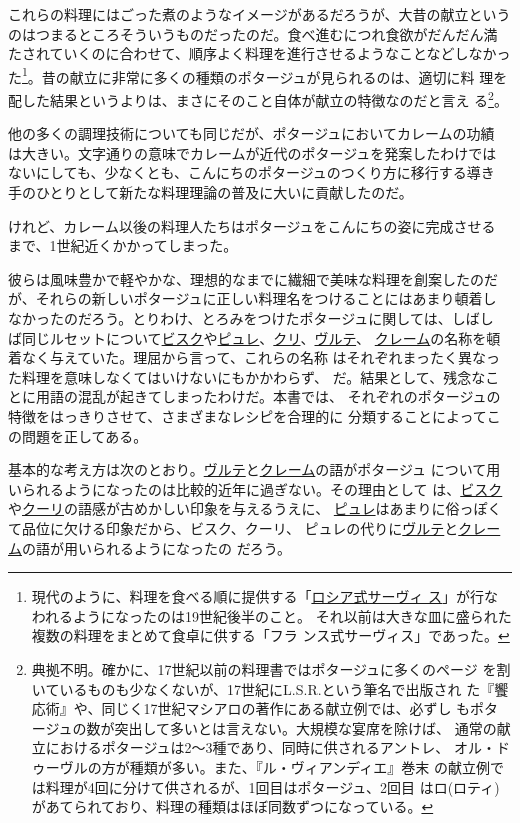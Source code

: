 これらの料理にはごった煮のようなイメージがあるだろうが、大昔の献立という
のはつまるところそういうものだったのだ。食べ進むにつれ食欲がだんだん満
たされていくのに合わせて、順序よく料理を進行させるようなことなどしなかっ
た\footnote{現代のように、料理を食べる順に提供する「\protect\hyperlink{service-russe}{ロシア式サーヴィ
  ス}」が行なわれるようになったのは19世紀後半のこと。
  それ以前は大きな皿に盛られた複数の料理をまとめて食卓に供する「フラ
  ンス式サーヴィス」であった。}。昔の献立に非常に多くの種類のポタージュが見られるのは、適切に料
理を配した結果というよりは、まさにそのこと自体が献立の特徴なのだと言え
る\footnote{典拠不明。確かに、17世紀以前の料理書ではポタージュに多くのページ
  を割いているものも少なくないが、17世紀にL.S.R.という筆名で出版され
  た『饗応術』や、同じく17世紀マシアロの著作にある献立例では、必ずし
  もポタージュの数が突出して多いとは言えない。大規模な宴席を除けば、
  通常の献立におけるポタージュは2〜3種であり、同時に供されるアントレ、
  オル・ドゥーヴルの方が種類が多い。また、『ル・ヴィアンディエ』巻末
  の献立例では料理が4回に分けて供されるが、1回目はポタージュ、2回目
  はロ(ロティ)があてられており、料理の種類はほぼ同数ずつになっている。}。

他の多くの調理技術についても同じだが、ポタージュにおいてカレームの功績
は大きい。文字通りの意味でカレームが近代のポタージュを発案したわけでは
ないにしても、少なくとも、こんにちのポタージュのつくり方に移行する導き
手のひとりとして新たな料理理論の普及に大いに貢献したのだ。

けれど、カレーム以後の料理人たちはポタージュをこんにちの姿に完成させる
まで、1世紀近くかかってしまった。

彼らは風味豊かで軽やかな、理想的なまでに繊細で美味な料理を創案したのだ
が、それらの新しいポタージュに正しい料理名をつけることにはあまり頓着し
なかったのだろう。とりわけ、とろみをつけたポタージュに関しては、しばし
ば同じルセットについて\ul{ビスク}や\ul{ピュレ}、\ul{クリ}、\ul{ヴルテ}、
\ul{クレーム}の名称を頓着なく与えていた。理屈から言って、これらの名称
はそれぞれまったく異なった料理を意味しなくてはいけないにもかかわらず、
だ。結果として、残念なことに用語の混乱が起きてしまったわけだ。本書では、
それぞれのポタージュの特徴をはっきりさせて、さまざまなレシピを合理的に
分類することによってこの問題を正してある。

基本的な考え方は次のとおり。\ul{ヴルテ}と\ul{クレーム}の語がポタージュ
について用いられるようになったのは比較的近年に過ぎない。その理由として
は、\ul{ビスク}や\ul{クーリ}の語感が古めかしい印象を与えるうえに、
\ul{ピュレ}はあまりに俗っぽくて品位に欠ける印象だから、ビスク、クーリ、
ピュレの代りに\ul{ヴルテ}と\ul{クレーム}の語が用いられるようになったの
だろう。

